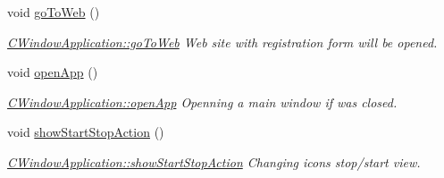 \begin{DoxyCompactItemize}
\mbox{\label{classCWindowApplication_abeca4de481b930c60eac7dd53060a2d7}} 
void \hyperlink{classCWindowApplication_abeca4de481b930c60eac7dd53060a2d7}{go\+To\+Web} ()
\begin{DoxyCompactList}\small\item\em \hyperlink{classCWindowApplication_abeca4de481b930c60eac7dd53060a2d7}{C\+Window\+Application\+::go\+To\+Web} Web site with registration form will be opened. \end{DoxyCompactList}\item 
\mbox{\label{classCWindowApplication_afb324302fab267bc92ee7247d193e7dc}} 
void \hyperlink{classCWindowApplication_afb324302fab267bc92ee7247d193e7dc}{open\+App} ()
\begin{DoxyCompactList}\small\item\em \hyperlink{classCWindowApplication_afb324302fab267bc92ee7247d193e7dc}{C\+Window\+Application\+::open\+App} Openning a main window if was closed. \end{DoxyCompactList}\item 
\mbox{\label{classCWindowApplication_ae488944d1d544bc73988c40b7572808b}} 
void \hyperlink{classCWindowApplication_ae488944d1d544bc73988c40b7572808b}{show\+Start\+Stop\+Action} ()
\begin{DoxyCompactList}\small\item\em \hyperlink{classCWindowApplication_ae488944d1d544bc73988c40b7572808b}{C\+Window\+Application\+::show\+Start\+Stop\+Action} Changing icons stop/start view. \end{DoxyCompactList}\end{DoxyCompactItemize}
